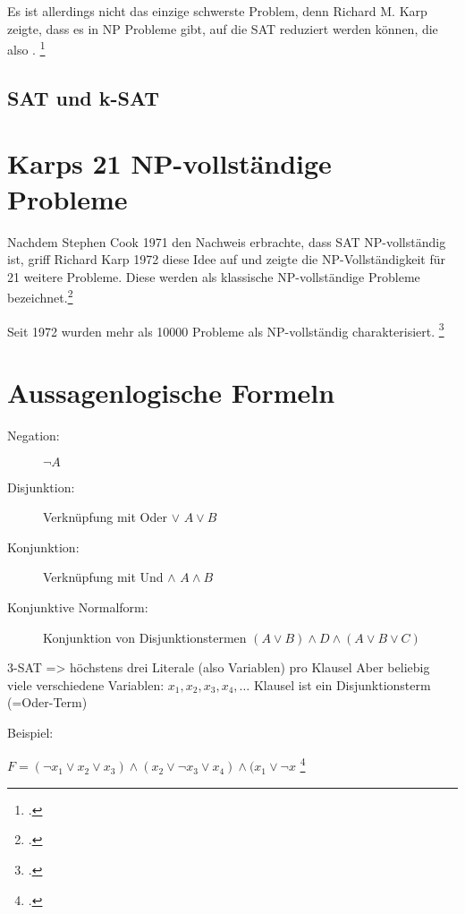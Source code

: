 \documentclass{lehramt-informatik-haupt}
\begin{document}
Es ist allerdings nicht das einzige schwerste Problem, denn Richard M.
Karp zeigte, dass es in NP Probleme gibt, auf die SAT reduziert werden
können, die also .
\footcite[Seite 70]{theo:fs:4}

\subsection{SAT und k-SAT}

\liProblemSat

\section{Karps 21 NP-vollständige Probleme}

Nachdem Stephen Cook 1971 den Nachweis erbrachte, dass SAT
NP-vollständig ist, griff Richard Karp 1972 diese Idee auf und zeigte
die NP-Vollständigkeit für 21 weitere Probleme. Diese werden als
klassische NP-vollständige Probleme bezeichnet.\footcite{wiki:karps-21}

Seit 1972 wurden mehr als 10000 Probleme als NP-vollständig
charakterisiert.
\footcite[Seite 80]{theo:fs:4}

\section{Aussagenlogische Formeln}

\begin{description}
\item[Negation:]

$\neg A$

\item[Disjunktion:]

Verknüpfung mit Oder $\lor$
$A \lor B$

\item[Konjunktion:]

Verknüpfung mit Und $\land$
$A \land B$

\item[Konjunktive Normalform:]
Konjunktion von Disjunktionstermen
$(A \lor B) \land D \land (A \lor B \lor C)$
\end{description}

3-SAT => höchstens drei Literale (also Variablen) pro Klausel
Aber beliebig viele verschiedene Variablen: $x_1, x_2, x_3, x_4, \dots$
Klausel ist ein Disjunktionsterm (=Oder-Term)

Beispiel:

$F = (\neg x_1 \lor x_2 \lor x_3 ) \land (x_2 \lor \neg x_3 \lor x_4 )
\land (x_1 \lor \neg x$
\footcite[Seite 72]{theo:fs:4}
%
\end{document}
